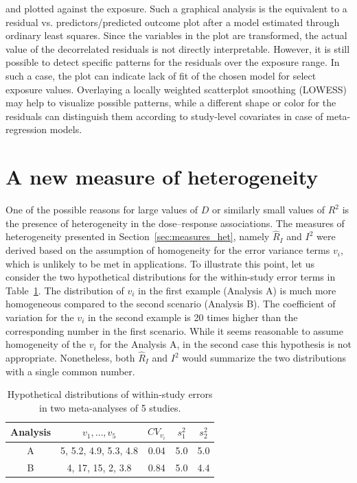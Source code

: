 \documentclass[11pt,a4paper,twoside,openany]{book}\usepackage{knitr}
\begin{document}
{{\noindent and plotted against the exposure. Such a graphical analysis is the equivalent to a residual vs. predictors/predicted outcome plot after a model estimated through ordinary least squares. Since the variables in the plot are transformed, the actual value of the decorrelated residuals is not directly interpretable. However, it is still possible to detect specific patterns for the residuals over the exposure range. In such a case, the plot can indicate lack of fit of the chosen model for select exposure values. Overlaying a locally weighted scatterplot smoothing (LOWESS) may help to visualize possible patterns, while a different shape or color for the residuals can distinguish them according to study-level covariates in case of meta-regression models.



\section{A new measure of heterogeneity}\label{sec:Rb}

One of the possible reasons for large values of $D$ or similarly small values of $R^2$ is the presence of heterogeneity in the dose--response associations. The measures of heterogeneity presented in Section~\ref{sec:measures_het}, namely $\hat R_I$ and $I^2$ were derived based on the assumption of homogeneity for the error variance terms $v_i$, which is unlikely to be met in applications. To illustrate this point, let us consider the two hypothetical distributions for the within-study error terms in Table~\ref{tab:hyp_vi}. The distribution of $v_i$ in the first example (Analysis A) is much more homogeneous compared to the second scenario (Analysis B). The coefficient of variation for the $v_i$ in the second example is 20 times higher than the corresponding number in the first scenario. While it seems reasonable to assume homogeneity of the $v_i$ for the Analysis A, in the second case this hypothesis is not appropriate. Nonetheless, both $\hat R_I$ and $I^2$ would summarize the two distributions with a single common number. 

\begin{table}[ht]
\centering
\caption{Hypothetical distributions of within-study errors 
in two meta-analyses of 5 studies.} 
\label{tab:hyp_vi}
\begin{tabular}{ccccc}
  \hline
Analysis & $v_1, \dots, v_5$ & $CV_{v_i}$ & $s_1^2$ & $s_2^2$ \\ 
  \hline
A & 5, 5.2, 4.9, 5.3, 4.8 & 0.04 & 5.0 & 5.0 \\ 
  B & 4, 17, 15, 2, 3.8 & 0.84 & 5.0 & 4.4 \\ 
   \hline
\end{tabular}
\end{table}


}}
\end{document}
